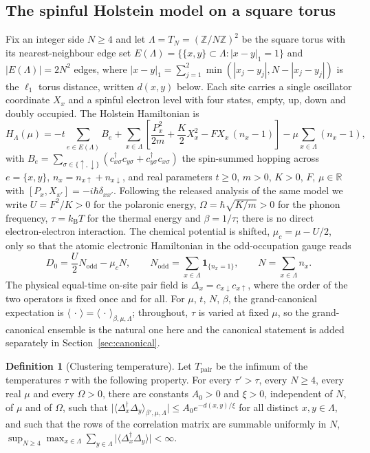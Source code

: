\documentclass[11pt]{article}
\theoremstyle{plain}
\theoremstyle{definition}
\newtheorem{definition}{Definition}
\newcommand{\Nodd}{N_{\mathrm{odd}}}
\newcommand{\Dop}{\Delta}
\begin{document}
\subsection{The spinful Holstein model on a square torus}

Fix an integer side $N\ge4$ and let $\Lambda=T_N=(\mathbb{Z}/N\mathbb{Z})^{2}$ be the
square torus with its nearest-neighbour edge set $E(\Lambda)=\{\{x,y\}\subset\Lambda:
|x-y|_{1}=1\}$ and $|E(\Lambda)|=2N^{2}$ edges, where
$|x-y|_{1}=\sum_{j=1}^{2}\min(|x_{j}-y_{j}|,N-|x_{j}-y_{j}|)$ is the $\ell_{1}$
torus distance, written $d(x,y)$ below. Each site carries a single oscillator
coordinate $X_x$ and a spinful electron level with four states, empty, up, down and
doubly occupied. The Holstein Hamiltonian \cite{holstein1959} is
\begin{equation}\label{eq:H}
H_\Lambda(\mu)=-t\sum_{e\in E(\Lambda)}B_e
+\sum_{x\in\Lambda}\left[\frac{P_x^{2}}{2m}+\frac{K}{2}X_x^{2}
-F X_x\,(n_x-1)\right]-\mu\sum_{x\in\Lambda}(n_x-1),
\end{equation}
with $B_e=\sum_{\sigma\in\{\uparrow,\downarrow\}}
(c_{x\sigma}^{\dagger}c_{y\sigma}+c_{y\sigma}^{\dagger}c_{x\sigma})$ the
spin-summed hopping across $e=\{x,y\}$, $n_x=n_{x\uparrow}+n_{x\downarrow}$, and real
parameters $t\ge0$, $m>0$, $K>0$, $F$, $\mu\in\mathbb{R}$ with
$[P_x,X_{x'}]=-i\hbar\delta_{xx'}$. Following the released analysis of the same
model we write $U=F^{2}/K>0$ for the polaronic energy,
$\Omega=\hbar\sqrt{K/m}>0$ for the phonon frequency, $\tau=k_{\mathrm{B}}T$ for the
thermal energy and $\beta=1/\tau$; there is no direct electron-electron
interaction. The chemical potential is shifted, $\mu_c=\mu-U/2$, only so that the
atomic electronic Hamiltonian in the odd-occupation gauge reads
\begin{equation}\label{eq:D0}
D_0=\frac{U}{2}\Nodd-\mu_c N,\qquad
\Nodd=\sum_{x\in\Lambda}\mathbf{1}_{\{n_x=1\}},\qquad
N=\sum_{x\in\Lambda}n_x .
\end{equation}
The physical equal-time on-site pair field is
$\Dop_x=c_{x\downarrow}c_{x\uparrow}$, where the order of the two operators is fixed
once and for all. For $\mu$, $t$, $N$, $\beta$, the grand-canonical expectation is
$\langle\,\cdot\,\rangle=\langle\,\cdot\,\rangle_{\beta,\mu,\Lambda}$; throughout,
$\tau$ is varied at fixed $\mu$, so the grand-canonical ensemble is the natural one
here and the canonical statement is added separately in
Section~\ref{sec:canonical}.

\begin{definition}[Clustering temperature]\label{def:tpair}
Let $T_{\mathrm{pair}}$ be the infimum of the temperatures $\tau$ with the following
property. For every $\tau'>\tau$, every $N\ge4$, every real $\mu$ and every
$\Omega>0$, there are constants $A_0>0$ and $\xi>0$, independent of $N$, of $\mu$ and
of $\Omega$, such that
$\bigl|\langle\Dop_x^\dagger\Dop_y\rangle_{\beta',\mu,\Lambda}\bigr|
\le A_0e^{-d(x,y)/\xi}$ for all distinct $x,y\in\Lambda$, and such that the rows of
the correlation matrix are summable uniformly in $N$,
$\sup_{N\ge4}\max_{x\in\Lambda}\sum_{y\in\Lambda}
\bigl|\langle\Dop_x^\dagger\Dop_y\rangle\bigr|<\infty$.
\end{definition}
\end{document}

